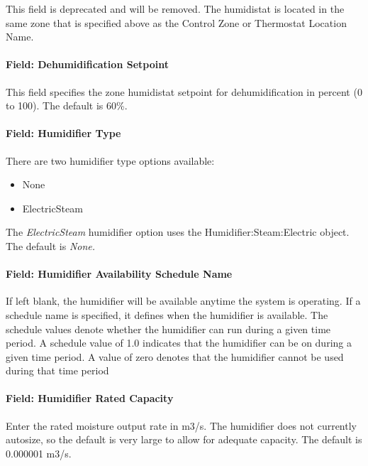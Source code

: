 This field is deprecated and will be removed. The humidistat is located in the same zone that is specified above as the Control Zone or Thermostat Location Name.

\paragraph{Field: Dehumidification Setpoint}\label{field-dehumidification-setpoint-1}

This field specifies the zone humidistat setpoint for dehumidification in percent (0 to 100). The default is 60\%.

\paragraph{Field: Humidifier Type}\label{field-humidifier-type}

There are two humidifier type options available:

\begin{itemize}
\item
  None
\item
  ElectricSteam
\end{itemize}

The \emph{ElectricSteam} humidifier option uses the Humidifier:Steam:Electric object. The default is \emph{None.}

\paragraph{Field: Humidifier Availability Schedule Name}\label{field-humidifier-availability-schedule-name}

If left blank, the humidifier will be available anytime the system is operating. If a schedule name is specified, it defines when the humidifier is available. The schedule values denote whether the humidifier can run during a given time period. A schedule value of 1.0 indicates that the humidifier can be on during a given time period. A value of zero denotes that the humidifier cannot be used during that time period

\paragraph{Field: Humidifier Rated Capacity}\label{field-humidifier-rated-capacity}

Enter the rated moisture output rate in m3/s. The humidifier does not currently autosize, so the default is very large to allow for adequate capacity. The default is 0.000001 m3/s.

